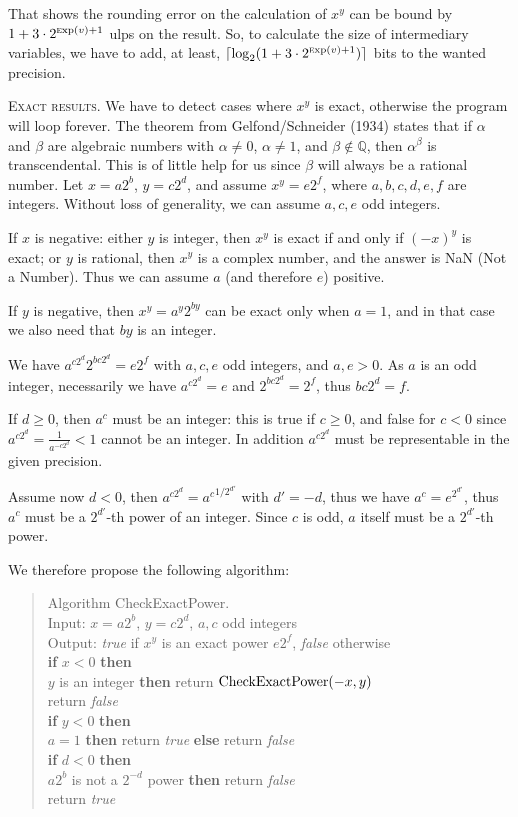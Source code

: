 \documentclass[12pt]{amsart}
\def\q{\hspace*{5mm}}
\def\Exp{{\rm \textsc exp}}
\def\Q{{\mathbb Q}}
\begin{document}
That shows the rounding error on the calculation of $x^y$
can be bound by $1 + 3 \cdot 2^{\Exp(v)+1}$ ulps on the result. So,
to calculate the size of intermediary variables, we have to add, at
least, $\lceil \log_2 (1+3 \cdot 2^{\Exp(v)+1}) \rceil$ bits to the wanted
precision.

\noindent
\textsc{Exact results.}
We have to detect cases where $x^y$ is exact, otherwise the program will
loop forever.
The theorem from Gelfond/Schneider (1934) states that if $\alpha$ and
$\beta$ are algebraic numbers with $\alpha \neq 0$, $\alpha \neq 1$,
and $\beta \notin \Q$, then $\alpha^{\beta}$ is transcendental.
This is of little help for us since $\beta$ will always be a rational
number.
Let $x = a 2^b$, $y = c 2^d$, and assume $x^y = e 2^f$, where
$a, b, c, d, e, f$ are integers.
Without loss of generality, we can assume $a, c, e$ odd integers.

If $x$ is negative: either $y$ is integer, then $x^y$ is exact if and only if
$(-x)^y$ is exact; or $y$ is rational, then $x^y$ is a complex number,
and the answer is NaN (Not a Number).
Thus we can assume $a$ (and therefore $e$) positive.

If $y$ is negative, then $x^y = a^y 2^{b y}$ can be exact only when
$a=1$, and in that case we also need that $b y$ is an integer.

We have $a^{c 2^d} 2^{b c 2^d} = e 2^f$ with $a, c, e$ odd integers,
and $a, e > 0$.
As $a$ is an odd integer, necessarily we have $a^{c 2^d} = e$
and $2^{b c 2^d} = 2^f$, thus $b c 2^d = f$.

If $d \geq 0$, then $a^c$ must be an integer: this is true if $c \geq 0$,
and false for $c < 0$ since $a^{c 2^d} = \frac{1}{a^{-c 2^d}} < 1$ cannot be an
integer. In addition $a^{c 2^d}$ must be representable in the given precision.

Assume now $d < 0$,
then $a^{c 2^d} = {a^c}^{1/2^{d'}}$ with $d'=-d$, thus
we have $a^c = e^{2^{d'}}$, thus $a^c$ must be a $2^{d'}$-th power
of an integer.
Since $c$ is odd, $a$ itself must be a $2^{d'}$-th power.

We therefore propose the following algorithm:
\begin{quote}
Algorithm CheckExactPower. \\
Input: $x=a 2^b$, $y=c 2^d$, $a, c$ odd integers \\
Output: \emph{true} if $x^y$ is an exact power $e 2^f$, \emph{false} otherwise\\
{\bf if} $x < 0$ {\bf then} \\
\q {\bf if} $y$ is an integer {\bf then} return ${\rm CheckExactPower}(-x,y)$\\
\q {\bf else} return \emph{false} \\
{\bf if} $y < 0$ {\bf then} \\
\q {\bf if} $a=1$ {\bf then} return \emph{true} {\bf else} return \emph{false}\\
{\bf if} $d < 0$ {\bf then} \\
\q {\bf if} $a 2^b$ is not a $2^{-d}$ power {\bf then} return \emph{false} \\
return \emph{true}
\end{quote}
\end{document}
